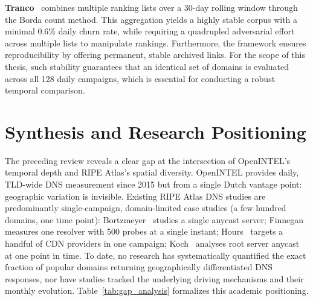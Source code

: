\textbf{Tranco}~\cite{LePochat2019} combines multiple ranking lists over a 30-day rolling window through the Borda count method. This aggregation yields a highly stable corpus with a minimal 0.6\% daily churn rate, while requiring a quadrupled adversarial effort across multiple lists to manipulate rankings. Furthermore, the framework ensures reproducibility by offering permanent, stable archived links. For the scope of this thesis, such stability guarantees that an identical set of domains is evaluated across all 128 daily campaigns, which is essential for conducting a robust temporal comparison.

\section{Synthesis and Research Positioning}
\label{sec:2.7}

The preceding review reveals a clear gap at the intersection of OpenINTEL’s temporal depth and RIPE Atlas’s spatial diversity. OpenINTEL provides daily, \ac{TLD}-wide \ac{DNS} measurement since 2015 but from a single Dutch vantage point: geographic variation is invisible. Existing RIPE Atlas \ac{DNS} studies are predominantly single-campaign, domain-limited case studies (a few hundred domains, one time point): Bortzmeyer~\cite{Bortzmeyer2013} studies a single anycast server; Finnegan~\cite{Finnegan2018} measures one resolver with 500 probes at a single instant; Hours~\cite{Hours2016} targets a handful of \ac{CDN} providers in one campaign; Koch~\cite{Koch2021} analyses root server anycast at one point in time. To date, no research has systematically quantified the exact fraction of popular domains returning geographically differentiated \ac{DNS} responses, nor have studies tracked the underlying driving mechanisms and their monthly evolution. Table~\ref{tab:gap_analysis} formalizes this academic positioning.

